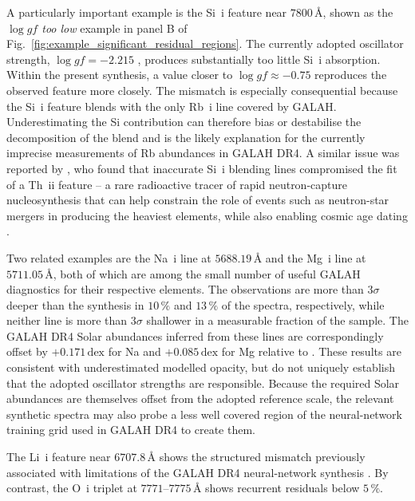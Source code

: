 \documentclass[twocolumn,apj,numberedappendix,appendixfloats]{openjournal}
\begin{document}
A particularly important example is the Si~{\sc i} feature near $7800\,\text{\AA}$, shown as the \textit{$\log gf$ too low} example in panel B of Fig.~\ref{fig:example_significant_residual_regions}. The currently adopted oscillator strength, $\log gf=-2.215$ \citep{K07}, produces substantially too little Si~{\sc i} absorption. Within the present synthesis, a value closer to $\log gf\approx-0.75$ \citep{Abia2020} reproduces the observed feature more closely. The mismatch is especially consequential because the Si~{\sc i} feature blends with the only Rb~{\sc i} line covered by GALAH. Underestimating the Si contribution can therefore bias or destabilise the decomposition of the blend and is the likely explanation for the currently imprecise measurements of Rb abundances in GALAH DR4. A similar issue was reported by \citet{Azhari2025}, who found that inaccurate Si~{\sc i} blending lines compromised the fit of a Th~{\sc ii} feature -- a rare radioactive tracer of rapid neutron-capture nucleosynthesis that can help constrain the role of events such as neutron-star mergers in producing the heaviest elements, while also enabling cosmic age dating \citep{Hill2002}.

Two related examples are the Na~{\sc i} line at $5688.19\,\text{\AA}$ and the Mg~{\sc i} line at $5711.05\,\text{\AA}$, both of which are among the small number of useful GALAH diagnostics for their respective elements. The observations are more than $3\sigma$ deeper than the synthesis in $10\,\mathrm{\%}$ and $13\,\mathrm{\%}$ of the spectra, respectively, while neither line is more than $3\sigma$ shallower in a measurable fraction of the sample. The GALAH DR4 Solar abundances inferred from these lines are correspondingly offset by $+0.171\,\mathrm{dex}$ for Na and $+0.085\,\mathrm{dex}$ for Mg relative to \citet{Grevesse2007}. These results are consistent with underestimated modelled opacity, but do not uniquely establish that the adopted oscillator strengths are responsible. Because the required Solar abundances are themselves offset from the adopted reference scale, the relevant synthetic spectra may also probe a less well covered region of the neural-network training grid used in GALAH DR4 to create them.

The Li~{\sc i} feature near $6707.8\,\text{\AA}$ shows the structured mismatch previously associated with limitations of the GALAH DR4 neural-network synthesis \citep[Sec.~8.3.4]{Buder2025b}. By contrast, the O~{\sc i} triplet at $7771$--$7775\,\text{\AA}$ shows recurrent residuals below $5\,\mathrm{\%}$.
\end{document}
